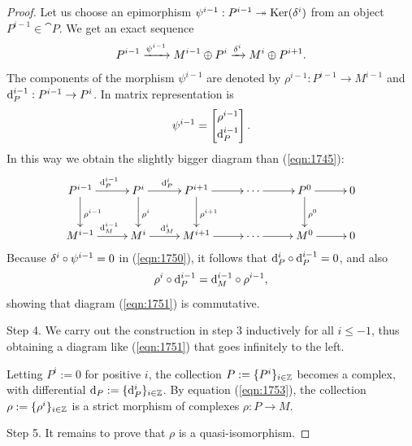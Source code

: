 \begin{proof}
Let us choose an epimorphism
$\psi^{i - 1} : P^{i - 1} \twoheadrightarrow  \operatorname{Ker}(\delta^{i})$ 
from an object $P^{i - 1} \in \cat{P}$. 
We get an exact sequence 
\begin{equation} \label{eqn:1750}
P^{i - 1} \xrightarrow{\psi^{i - 1}} M^{i - 1} \oplus P^{i} \xrightarrow{\delta^i}
M^{i} \oplus P^{i + 1} .
\end{equation}
The components of the morphism $\psi^{i - 1}$ are denoted by 
$\rho^{i - 1} : P^{i - 1} \to  M^{i - 1}$ and 
$\mathrm{d}_P^{i - 1} : P^{i - 1} \to  P^{i}$.
In matrix representation is 
\begin{equation} \label{eqn:5061}
\psi^{i - 1} = \begin{bmatrix}  \rho^{i - 1} \\[0.3em] \mathrm{d}_P^{i - 1}  \end{bmatrix} . 
\end{equation}
In this way we obtain the slightly bigger diagram than (\ref{eqn:1745}):
\begin{equation} \label{eqn:1751}
\UseTips \xymatrix @C=6ex @R=6ex {
P^{i - 1}
\ar[d]^{\rho^{i - 1}}
\ar[r]^{\d_P^{i - 1}}
&
P^i
\ar[d]^{\rho^i}
\ar[r]^{\d_P^i}
&
P^{i + 1}
\ar[d]^{\rho^{i + 1}}
\ar[r] 
&
\cdots 
\ar[r]
& 
P^0 
\ar[d]^{\rho^0}
\ar[r]
&
0
\\
M^{i - 1}
\ar[r]^{\d_M^{i - 1}}
&
M^i
\ar[r]^{\d_M^{i}}
&
M^{i + 1}
\ar[r] 
&
\cdots 
\ar[r]
& 
M^0 
\ar[r]
&
0
} 
\end{equation}
Because $\delta^i \circ \psi^{i - 1} = 0$ in (\ref{eqn:1750}), it follows that
$\mathrm{d}_P^{i} \circ \mathrm{d}_P^{i - 1} = 0$, and also 
\begin{equation} \label{eqn:1753}
\rho^{i} \circ \mathrm{d}_P^{i - 1} = \mathrm{d}_M^{i - 1}  \circ \rho^{i - 1} ,
\end{equation}
showing that diagram (\ref{eqn:1751}) is commutative. 

\medskip \noindent
Step 4. We carry out the construction in step 3 inductively for all $i \leq -1$, 
thus obtaining a diagram like (\ref{eqn:1751}) that goes infinitely to the 
left. 

Letting $P^i := 0$ for positive $i$, the 
collection $P := \{ P^i \}_{i \in \mathbb{Z}}$ becomes a complex, with 
differential $\mathrm{d}_P := \{ \mathrm{d}_P^{i} \}_{i \in \mathbb{Z}}$.
By equation (\ref{eqn:1753}), the collection 
$\rho := \{ \rho^{i} \}_{i \in \mathbb{Z}}$ is a strict morphism 
of complexes $\rho : P \to M$. 

\medskip \noindent
Step 5. It remains to prove that $\rho$ is a quasi-isomorphism.


\end{proof}
